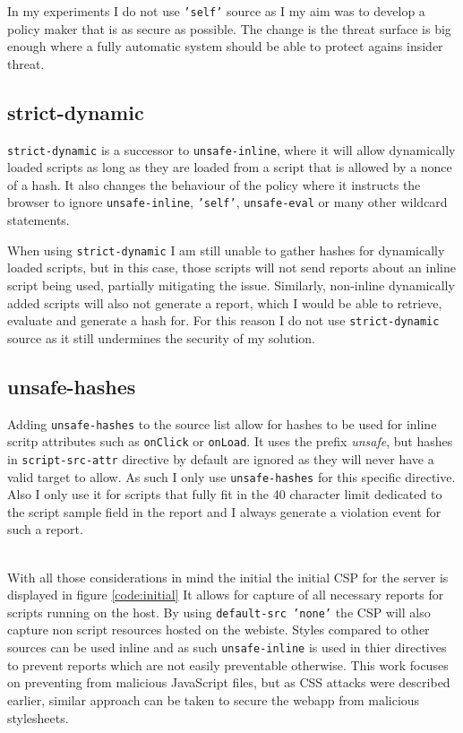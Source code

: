 \begin{description}
In my experiments I do not use \texttt{'self'} source as I my aim was to develop a policy maker that is as secure as possible.
The change is the threat surface is big enough where a fully automatic system should be able to protect agains insider threat.

\subsection{strict-dynamic}

\texttt{strict-dynamic} is a successor to \texttt{unsafe-inline}, where it will allow dynamically loaded scripts as long as they are loaded from a script that is allowed by a nonce of a hash.
It also changes the behaviour of the policy where it instructs the browser to ignore \texttt{unsafe-inline}, \texttt{'self'}, \texttt{unsafe-eval} or many other wildcard statements.

When using \texttt{strict-dynamic} I am still unable to gather hashes for dynamically loaded scripts, but in this case, those scripts will not send reports about an inline script being used, partially mitigating the issue.
Similarly, non-inline dynamically added scripts will also not generate a report, which I would be able to retrieve, evaluate and generate a hash for.
For this reason I do not use \texttt{strict-dynamic} source as it still undermines the security of my solution.

\subsection{unsafe-hashes}

Adding \texttt{unsafe-hashes} to the source list allow for hashes to be used for inline scritp attributes such as \texttt{onClick} or \texttt{onLoad}.
It uses the prefix {\it unsafe}, but hashes in \texttt{script-src-attr} directive by default are ignored as they will never have a valid target to allow.
As such I only use \texttt{unsafe-hashes} for this specific directive. 
Also I only use it for scripts that fully fit in the 40 character limit dedicated to the script sample field in the report and I always generate a violation event for such a report.

\\
With all those considerations in mind the initial the initial CSP for the server is displayed in figure \ref{code:initial}
It allows for capture of all necessary reports for scripts running on the host.
By using \texttt{default-src 'none'} the CSP will also capture non script resources hosted on the webiste.
Styles compared to other sources can be used inline and as such \texttt{unsafe-inline} is used in thier directives to prevent reports which are not easily preventable otherwise.
This work focuses on preventing from malicious JavaScript files, but as CSS attacks were described earlier, similar approach can be taken to secure the webapp from malicious stylesheets.



\end{description}

